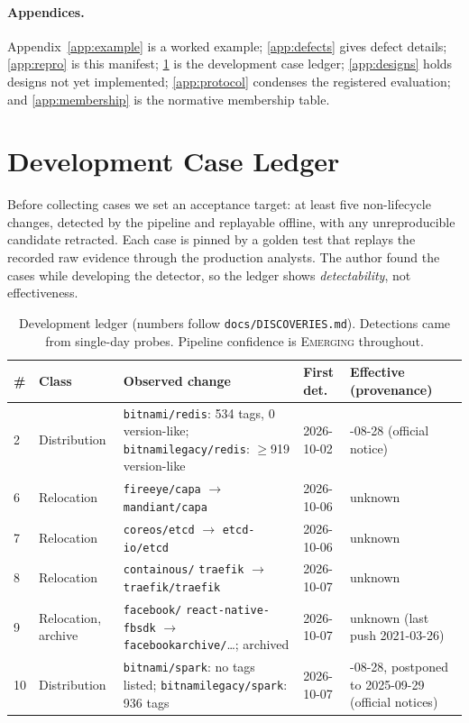 \documentclass[11pt,a4paper]{article}
\newcommand{\code}[1]{\texttt{#1}}
\begin{document}
\paragraph{Appendices.} Appendix~\ref{app:example} is a worked
example; \ref{app:defects} gives defect details; \ref{app:repro} is
this manifest; \ref{sec:cases} is the development case ledger;
\ref{app:designs} holds designs not yet implemented;
\ref{app:protocol} condenses the registered evaluation; and
\ref{app:membership} is the normative membership table.
\par\endgroup

\section{Development Case Ledger}
\label{sec:cases}

Before collecting cases we set an acceptance target: at least five
non-lifecycle changes, detected by the pipeline and replayable offline,
with any unreproducible candidate retracted. Each case is pinned by a
golden test that replays the recorded raw evidence through the
production analysts. The author found the cases while developing the
detector, so the ledger shows \emph{detectability}, not effectiveness.

\begin{table}[t]
\centering
\footnotesize
\begin{tabularx}{\linewidth}{@{}l >{\raggedright\arraybackslash}p{1.6cm} >{\raggedright\arraybackslash}X l >{\raggedright\arraybackslash}p{2.8cm}@{}}
\toprule
\# & Class & Observed change & First det. & Effective (provenance) \\
\midrule
2 & Distri\-bution &\code{bitnami/redis}: 534 tags, 0 version-like;
  \code{bitnamilegacy/redis}: $\ge$919 version-like & 2026-10-02 &
  2025-08-28 (official notice) \\
6 & Relocation & \code{fireeye/capa} $\to$ \code{mandiant/capa} &
  2026-10-06 & unknown \\
7 & Relocation & \code{coreos/etcd} $\to$ \code{etcd-io/etcd} &
  2026-10-06 & unknown \\
8 & Relocation & \code{containous/} \code{traefik} $\to$
  \code{traefik/traefik} & 2026-10-07 & unknown \\
9 & Relocation, archive & \code{facebook/} \code{react-native-fbsdk}
  $\to$ \code{facebookarchive/}\dots; archived & 2026-10-07 &
  unknown (last push 2021-03-26) \\
10 & Distri\-bution &\code{bitnami/spark}: no tags listed;
  \code{bitnamilegacy/spark}: 936 tags & 2026-10-07 &
  2025-08-28, postponed to 2025-09-29 (official notices) \\
\bottomrule
\end{tabularx}
\caption{Development ledger (numbers follow \code{docs/DISCOVERIES.md}).
Detections came from single-day probes. Pipeline confidence is
\textsc{Emerging} throughout.}
\label{tab:cases}
\end{table}
\end{document}
